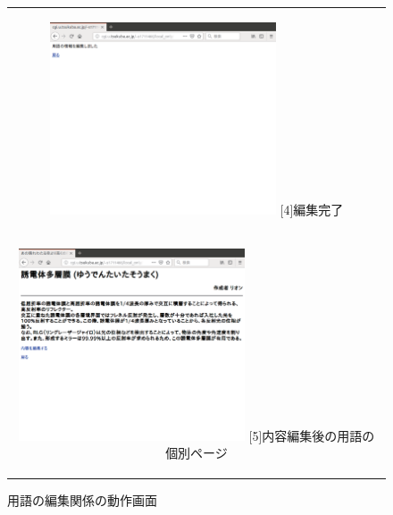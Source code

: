 \documentclass[12pt,a4paper]{jarticle}
\begin{document}
\begin{ttfamily}
\begin{figure}[htbp]
\begin{center}
\begin{tabular}{c}
      \begin{minipage}{0.55\hsize}
        \begin{center}
          \includegraphics[width=6.7cm]{10-3-14.eps}
          \hspace{1.6cm} [4]編集完了
        \end{center}
      \end{minipage}

      \begin{minipage}{0.55\hsize}
        \vspace{90mm}
      \end{minipage} \\

      \begin{minipage}{0.55\hsize}
        \begin{center}
          \includegraphics[width=6.7cm]{10-3-15.eps}
          \hspace{1.6cm} [5]内容編集後の用語の個別ページ
        \end{center}
      \end{minipage}

    \end{tabular}
    \caption{用語の編集関係の動作画面}
    \label{fig:b}
  \end{center}
\end{figure}

\begin{figure}[htbp]
  \begin{center}
    \begin{tabular}{c}


\end{tabular}
\end{center}
\end{figure}
\end{ttfamily}
\end{document}

